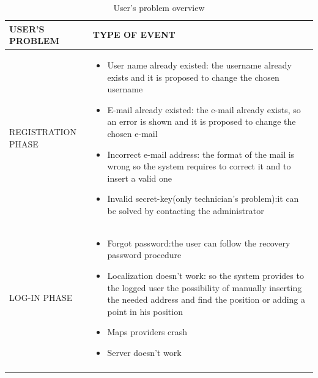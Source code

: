 \documentclass{article}
\begin{document}
\begin{longtable}{|l|p{}|}
    \hline
    USER'S PROBLEM      &         TYPE OF EVENT    
      \\
    \hline
      
      REGISTRATION PHASE  &        \begin{itemize}
                                   \item User name already existed: the username already exists and it is proposed to change the chosen username
                                   \item  E-mail already existed: the e-mail already exists, so an error is shown and it is proposed to change the chosen e-mail
                                   \item  Incorrect e-mail address: the format of the mail is wrong so the system requires to correct it and to insert a valid one
                                   
                                   \item Invalid secret-key(only technician's problem):it can be solved by contacting the administrator
                                   \end{itemize} 
                \\
    \hline
      LOG-IN PHASE &        \begin{itemize}
                            \item Forgot password:the user can follow the recovery password procedure
                            \item Localization doesn’t work: so the system provides to the logged user the possibility of  manually inserting the needed address and find the position or adding a point in his position
                            \item Maps providers crash
                            \item Server doesn’t work
                            \end{itemize}
             \\
            \hline
\caption{User's problem overview} \\

\end{longtable}
\end{document}

